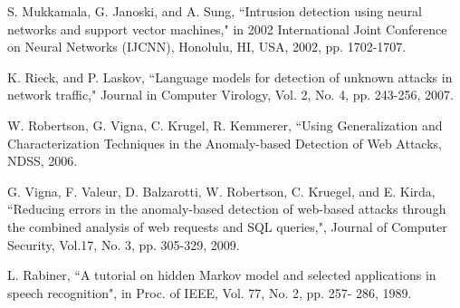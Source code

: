 \documentclass[10pt, conference, compsocconf]{IEEEtran}
\begin{document}
\begin{thebibliography}{1}
 S. Mukkamala, G. Janoski, and A. Sung, ``Intrusion detection using neural
networks and support vector machines," in 2002 International Joint Conference on
Neural Networks (IJCNN), Honolulu, HI, USA, 2002, pp. 1702-1707.

 K. Rieck, and P. Laskov, ``Language models for detection of unknown attacks in network traffic," Journal in Computer Virology, Vol. 2, No. 4, pp. 243-256, 2007.

	W. Robertson, G. Vigna, C. Krugel, R. Kemmerer, ``Using Generalization and Characterization Techniques in the Anomaly-based Detection of Web Attacks, NDSS, 2006.

 G. Vigna, F. Valeur, D. Balzarotti, W. Robertson, C. Kruegel, and E. Kirda, ``Reducing errors in the anomaly-based detection of web-based attacks through the combined analysis of web requests and SQL queries,", Journal of Computer Security, Vol.17, No. 3, pp. 305-329, 2009.

 L. Rabiner, ``A tutorial on hidden Markov model and
selected applications in speech recognition", in Proc. of IEEE, Vol. 77, No. 2, pp. 257- 286, 1989.

\end{thebibliography}




\end{document}
